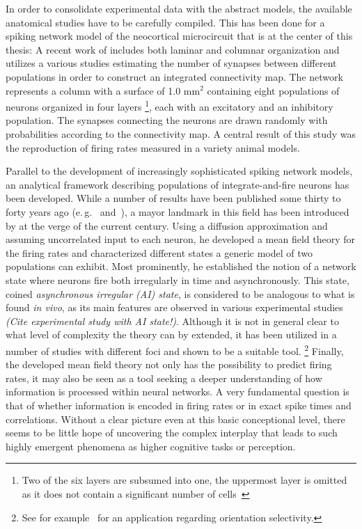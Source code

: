 In order to consolidate experimental data with the abstract models,
the available anatomical studies have to be carefully compiled.
This has been done for a spiking network model of the neocortical microcircuit
that is at the center of this thesis:
A recent work of  
includes both laminar and columnar organization and utilizes a various studies 
estimating the number of synapses between different populations in order to construct an
integrated connectivity map.
The network represents a column with a
surface of 1.0 $\text{mm}^2$ containing eight populations of neurons organized in four layers%
\footnote{
    Two of the six layers are subsumed into one, the uppermost layer is omitted as it
does not contain a significant number of cells~\cite{potjans2014}
}, each with an excitatory and an inhibitory population. 
The synapses connecting the neurons are drawn randomly with probabilities according to 
the connectivity map. A central result of this study was the reproduction of 
firing rates measured in a variety animal models. 

Parallel to the development of increasingly sophisticated spiking network models, 
an analytical framework describing populations of integrate-and-fire neurons has 
been developed. While a number of results have been published some thirty to forty years ago
(e.\,g.~ and~), a mayor landmark
in this field has been introduced by  at the verge of the current century.
Using a diffusion approximation and assuming uncorrelated input to each neuron, he
developed a mean field theory for the firing rates and characterized different states
a generic model of two populations can exhibit. Most prominently, he established the 
notion of a network state where neurons fire both irregularly in time and asynchronously. 
This state, coined \textit{asynchronous irregular (AI) state}, is considered to be 
analogous to what is found \textit{in vivo}, as its main features are observed in various 
experimental studies
\emph{(Cite experimental study with AI state!)}.
Although it is not in general clear to what level of complexity the theory can by extended, 
it has been utilized in a number of studies with different 
foci and shown to be a suitable tool.%
\footnote{
    See for example~ for an application 
    regarding orientation selectivity.
} Finally, the developed mean field theory not only has the possibility to predict 
firing rates, it may also be seen as a tool seeking a deeper understanding of 
how information is processed within neural networks. A very fundamental
question is that of whether information is encoded in firing rates 
or in exact spike times and correlations. Without a clear picture even at this basic
conceptional level, there seems to be little hope of uncovering the 
complex interplay that leads to such highly emergent phenomena as higher cognitive tasks 
or perception. 

